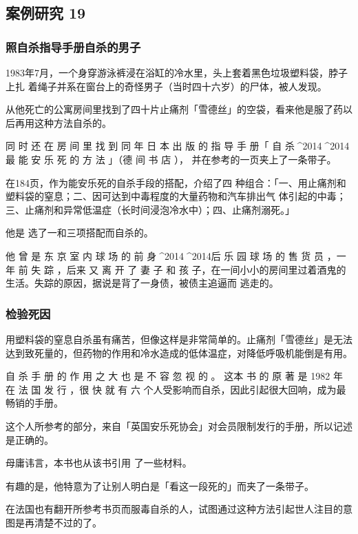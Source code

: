 \documentclass[UTF8]{ctexart}
\begin{document}
\subsection{案例研究 19}

\subsubsection*{照自杀指导手册自杀的男子}

1983年7月，一个身穿游泳裤浸在浴缸的冷水里，头上套着黑色垃圾塑料袋，脖子上扎
着绳子并系在窗台上的奇怪男子（当时四十六岁）的尸体，被人发现。

从他死亡的公寓房间里找到了四十片止痛剂「雪德丝」的空袋，看来他是服了药以后再用这种方法自杀的。

同 时 还 在 房 间 里 找 到 同 年 日 本 出 版 的 指 导 手 册「 自 杀^^^^2014^^^^2014最 能 安 乐 死 的 方 法 」（德 间 书 店 ）， 并在参考的一页夹上了一条带子。

在184页，作为能安乐死的自杀手段的搭配，介绍了四 种组合：「一、用止痛剂和塑料袋的窒息；二、因可达到中毒程度的大量药物和汽车排出气 体引起的中毒；三、止痛剂和异常低温症（长时间浸泡冷水中）；四、止痛剂溺死。」

他是 选了一和三项搭配而自杀的。 

他 曾 是 东 京 室 内 球 场 的 前 身^^^^2014^^^^2014后 乐 园 球 场 的 售 货 员 ，一 年 前 失 踪 ，后来 又 离 开 了 妻 子 和 孩 子，在一间小小的房间里过着酒鬼的生活。失踪的原因，据说是背了一身债，被债主追逼而 逃走的。

\subsubsection*{检验死因}

用塑料袋的窒息自杀虽有痛苦，但像这样是非常简单的。止痛剂「雪德丝」是无法达到致死量的，但药物的作用和冷水造成的低体温症，对降低呼吸机能倒是有用。

自 杀 手 册 的 作 用 之 大 也 是 不 容 忽 视 的 。
这本 书 的 原 著 是 1982 年 在 法 国 发 行 ，很 快 就 有 六 个人受影响而自杀，因此引起很大回响，成为最畅销的手册。

这个人所参考的部分，来自「英国安乐死协会」对会员限制发行的手册，所以记述是正确的。

母庸讳言，本书也从该书引用 了一些材料。 

有趣的是，他特意为了让别人明白是「看这一段死的」而夹了一条带子。

在法国也有翻开所参考书页而服毒自杀的人，试图通过这种方法引起世人注目的意图是再清楚不过的了。
\end{document}
